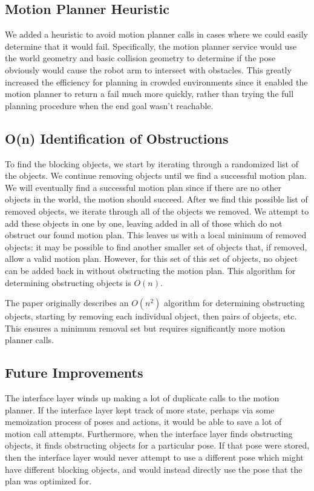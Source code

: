 \documentclass[12pt]{article}
\begin{document}
\subsection{Motion Planner Heuristic}

We added a heuristic to avoid motion planner calls in cases where we could easily determine that it would fail.
Specifically, the motion planner service would use the world geometry and basic collision geometry to determine if the pose obviously would cause the robot arm to intersect with obstacles.
This greatly increased the efficiency for planning in crowded environments since it enabled the motion planner to return a fail much more quickly, rather than trying the full planning procedure when the end goal wasn't reachable. 

\subsection{O(n) Identification of Obstructions}

To find the blocking objects, we start by iterating through a randomized list of the objects.  
We continue removing objects until we find a successful motion plan.  
We will eventually find a successful motion plan since if there are no other objects in the world, the motion should succeed.  
After we find this possible list of removed objects, we iterate through all of the objects we removed.  
We attempt to add these objects in one by one, leaving added in all of those which do not obstruct our found motion plan.  
This leaves us with a local minimum of removed objects: it may be possible to find another smaller set of objects that, if removed, allow a valid motion plan.  
However, for this set of this set of objects, no object can be added back in without obstructing the motion plan.
This algorithm for determining obstructing objects is $O(n)$.

The paper originally describes an $O(n^2)$ algorithm for determining obstructing objects, starting by removing each individual object, then pairs of objects, etc.  
This ensures a minimum removal set but requires significantly more motion planner calls.

\subsection{Future Improvements}

The interface layer winds up making a lot of duplicate calls to the motion planner.
If the interface layer kept track of more state, perhaps via some memoization process of poses and actions, it would be able to save a lot of motion call attempts.
Furthermore, when the interface layer finds obstructing objects, it finds obstructing objects for a particular pose.  
If that pose were stored, then the interface layer would never attempt to use a different pose which might have different blocking objects, and would instead directly use the pose that the plan was optimized for.
\end{document}
